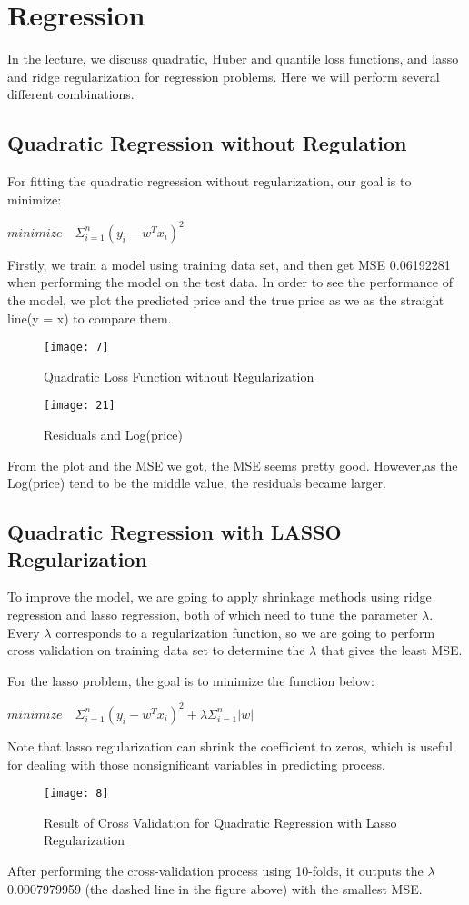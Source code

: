 \documentclass[12pt,twocolumn,twoside]{article}
\begin{document}
\section{Regression}
In the lecture, we discuss quadratic, Huber and quantile loss functions, and lasso and ridge regularization for regression problems. Here we will perform several different combinations.
\subsection{Quadratic Regression without Regulation}
For fitting the quadratic regression without regularization, our goal is to minimize:
\begin{center}
$minimize \quad \Sigma_{i=1}^n (y_i -w^T x_i)^2$
\end{center}
Firstly, we train a model using training data set, and then get MSE 0.06192281 when performing the model on the test data. In order to see the performance of the model, we plot the predicted price and the true price as we as the straight line(y = x) to compare them.
\begin{figure}[h]
\texttt{[image: 7]}
\caption{Quadratic Loss Function without Regularization}
\end{figure}
\begin{figure}[h]
\texttt{[image: 21]}
\caption{Residuals and Log(price)}
\end{figure}
 From the plot and the MSE we got, the MSE seems pretty good. However,as the Log(price) tend to be the middle value, the residuals became larger.

\subsection{Quadratic Regression with LASSO Regularization}
To improve the model, we are going to apply shrinkage methods using ridge regression and lasso regression, both of which need to tune the parameter $\lambda$. Every $\lambda$ corresponds to a regularization function, so we are going to perform cross validation on training data set to determine the $\lambda$ that gives the least MSE.

For the lasso problem, the goal is to minimize the function below:
\begin{center}
$minimize \quad \Sigma_{i=1}^n (y_i -w^T x_i)^2+\lambda \Sigma_{i=1}^n \vert w \vert$
\end{center}
Note that lasso regularization can shrink the coefficient to zeros, which is useful for dealing with those nonsignificant variables in predicting process. 
\begin{figure}[h]
\texttt{[image: 8]}
\caption{Result of Cross Validation for Quadratic Regression with Lasso Regularization}
\end{figure}
After performing the cross-validation process using 10-folds, it outputs the $\lambda$ 0.0007979959 (the dashed line in the figure above) with the smallest MSE.
\end{document}
